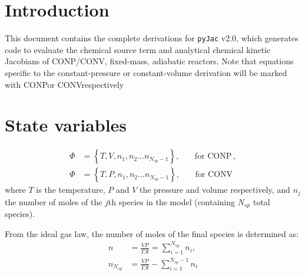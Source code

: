 \documentclass[12pt]{article}
\newcommand{\ns}{\ensuremath{{N_{sp}}}}
\newcommand{\conp}{CONP}
\newcommand{\conv}{CONV}
\newcommand{\dconp}{\ensuremath{,\qquad\text{for \conp}}}
\newcommand{\dconv}{\ensuremath{,\qquad\text{for \conv}}}
\newcommand{\Ru}{\ensuremath{\mathcal{R}}}
\begin{document}
\section{Introduction}
This document contains the complete derivations for \texttt{pyJac} v2.0, which generates code to evaluate the chemical source term and analytical chemical kinetic Jacobians of \conp\slash\conv, fixed-mass, adiabatic reactors.
Note that equations specific to the constant-pressure or constant-volume derivation will be marked with \conp or \conv respectively

\section{State variables}

\begin{subequations}
\begin{align}
\Phi &= \left\{T, V, n_1, n_2 \ldots n_{\ns - 1}\right\}\dconp, \\
\Phi &= \left\{T, P, n_1, n_2 \ldots n_{\ns - 1}\right\}\dconv
\end{align}
\end{subequations}
where $T$ is the temperature, $P$ and $V$ the pressure and volume respectively, and $n_j$ the number of moles of the $j$th species in the model (containing $\ns$ total species).

From the ideal gas law, the number of moles of the final species is determined as:
\begin{subequations}
\begin{align}
n &= \frac{V P}{T \Ru} = \sum_{i=1}^{\ns}{n_i}, \label{source:moles}\\
n_{\ns} &= \frac{V P}{T \Ru} - \sum_{i=1}^{\ns - 1}{n_i}
\end{align}
\end{subequations}
\end{document}
